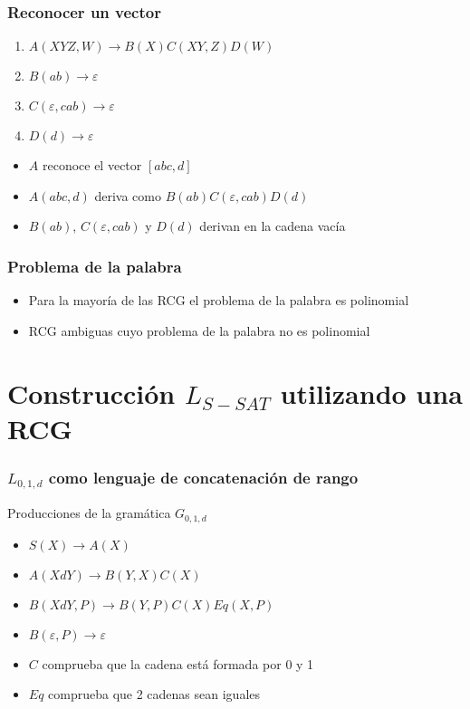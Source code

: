 \documentclass{beamer}
\begin{document}
\begin{frame}
    \frametitle{Reconocer un vector}
    
    \begin{enumerate}
        \item $A(XYZ,W)\to B(X)C(XY,Z)D(W)$
        \item $B(ab)\to \varepsilon$
        \item $C(\varepsilon,cab)\to \varepsilon$
        \item $D(d)\to \varepsilon$
    \end{enumerate}
    
    \pause
    
    \vspace{1cm}
    
    \begin{itemize}
        \item $A$ reconoce el vector $[abc,d]$
              \pause
        \item $A(abc,d)$ deriva como $B(ab)C(\varepsilon,cab)D(d)$
              \pause
        \item $B(ab)$, $C(\varepsilon,cab)$ y $D(d)$ derivan en la cadena vacía
    \end{itemize}
\end{frame}

\begin{frame}
    \frametitle{Problema de la palabra}
    \begin{itemize}
        \item Para la mayoría de las RCG el problema de la palabra es polinomial
              \pause
        \item RCG ambiguas cuyo problema de la palabra no es polinomial
    \end{itemize}
\end{frame}

\section{Construcción $L_{S-SAT}$ utilizando una RCG}
\begin{frame}
    \frametitle{$L_{0,1,d}$ como lenguaje de concatenación de rango}
    
    Producciones de la gramática $G_{0,1,d}$
    \begin{itemize}
        \item $S(X)\to A(X)$
              \pause
        \item $A(XdY)\to B(Y,X)C(X)$
              \pause
        \item $B(XdY,P)\to B(Y,P) C(X) Eq(X,P)$
              \pause
        \item $B(\varepsilon,P)\to \varepsilon$
    \end{itemize}
    \vspace{0.5cm}
    \begin{itemize}
        \item $C$ comprueba que la cadena está formada por 0 y 1
              \pause
        \item $Eq$ comprueba que 2 cadenas sean iguales
    \end{itemize}
\end{frame}
\end{document}
